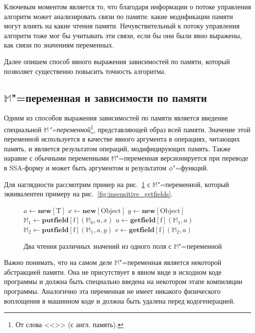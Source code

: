 \documentclass[14pt,titlepage,draft]{extarticle}
\newcommand{\M}{\ensuremath{\mathbb{M}}}
\let\mathphi\phi
\renewcommand{\phi}{\ensuremath{\mathphi}}
\newcommand{\type}[1]{\mathrm{#1}}
\newcommand{\field}[1]{\mathrm{#1}}
\newcommand{\op}[1]{\mathbf{#1}}
\begin{document}
    Ключевым моментом является то, что благодаря информации о потоке
    управления алгоритм может анализировать связи по памяти: какие модификации
    памяти могут влиять на какие чтения памяти. Нечувствительный к потоку
    управления алгоритм тоже мог бы учитывать эти связи, если бы они были явно
    выражены, как связи по значениям переменных.

    Далее опишем способ явного выражения зависимостей по памяти, который
    позволяет существенно повысить точность алгоритма.

  \subsection{\texorpdfstring{\M}{M}"=переменная и зависимости по памяти}

    Одним из способов выражения зависимостей по памяти является введение
    специальной \emph{\M"=переменной}\footnote{
      От слова <<>> (с англ. память).
    }, представляющей образ всей памяти.
    Значение этой переменной используется в качестве явного аргумента в
    операциях, читающих память, и является результатом операций, модифицирующих
    память. Также наравне с обычными переменными \M"=переменная версионируется
    при переводе в SSA-форму и может быть аргументом и результатом
    \phi"=функций.

    Для наглядности рассмотрим пример на
    рис.~\ref{fig:insensitive_getfields_with_m} с \M"=переменной, который
    эквивалентен примеру на рис.~\ref{fig:insensitive_getfields}.

    \begin{figure}[htbp]
      \begin{algorithmic}[1]
        \State $a \gets \op{new}[\type{T}]$
        \State $x \gets \op{new}[\type{Object}]$
        \State $y \gets \op{new}[\type{Object}]$
        \State $\M_1 \gets \op{putfield}[\field{f}](\M_0, a, x)$
        \State $u \gets \op{getfield}[\field{f}](\M_1, a)$
        \State $\M_2 \gets \op{putfield}[\field{f}](\M_1, a, y)$
        \State $v \gets \op{getfield}[\field{f}](\M_2, a)$
      \end{algorithmic}
      \caption{Два чтения различных значений из одного поля с \M"=переменной}
      \label{fig:insensitive_getfields_with_m}
    \end{figure}

    Важно понимать, что на самом деле \M"=переменная является некоторой
    абстракцией памяти. Она не присутствует в явном виде в исходном коде
    программы и должна быть специально введена на некотором этапе компиляции
    программы. Аналогично эта переменная не имеет никакого физического
    воплощения в машинном коде и должна быть удалена перед кодогенерацией.
\end{document}
